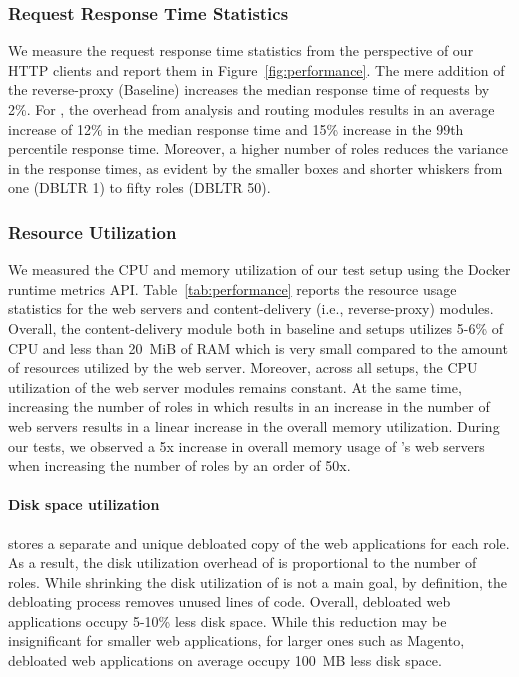\subsubsection{Request Response Time Statistics}
We measure the request response time statistics from the perspective of our HTTP clients and report them in Figure~\ref{fig:performance}. 
The mere addition of the reverse-proxy (Baseline) increases the median response time of requests by 2\%. 
For \dbltr{}, the overhead from analysis and routing modules results in an average increase of 12\% in the median response time and 15\% increase in the 99th percentile response time. 
Moreover, a higher number of roles reduces the variance in the response times, as evident by the smaller boxes and shorter whiskers from one (DBLTR 1) to fifty roles (DBLTR 50). 

\subsubsection{Resource Utilization}
We measured the CPU and memory utilization of our test setup using the Docker runtime metrics API. 
Table~\ref{tab:performance} reports the resource usage statistics for the web servers and content-delivery (i.e., reverse-proxy) modules. 
Overall, the content-delivery module both in baseline and \dbltr{} setups utilizes 5-6\% of CPU and less than 20~MiB of RAM which is very small compared to the amount of resources utilized by the web server. 
Moreover, across all setups, the CPU utilization of the web server modules remains constant. 
At the same time, increasing the number of roles in \dbltr{} which results in an increase in the number of web servers results in a linear increase in the overall memory utilization. 
During our tests, we observed a 5x increase in overall memory usage of \dbltr{}'s web servers when increasing the number of roles by an order of 50x. 

\paragraph{Disk space utilization} \dbltr{} stores a separate and unique debloated copy of the web applications for each role. 
As a result, the disk utilization overhead of \dbltr{} is proportional to the number of roles. 
While shrinking the disk utilization of \dbltr{} is not a main goal, by definition, the debloating process removes unused lines of code. 
Overall, debloated web applications occupy 5-10\% less disk space. 
While this reduction may be insignificant for smaller web applications, for larger ones such as Magento, debloated web applications on average occupy 100~MB less disk space. 


